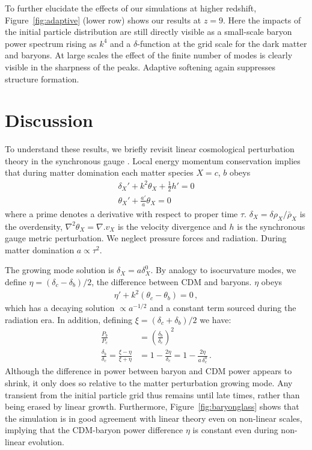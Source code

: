 \documentclass[a4paper,11pt]{article}
\begin{document}
To further elucidate the effects of our simulations at higher redshift, Figure~\ref{fig:adaptive} (lower row) shows our results at $z=9$. Here the impacts of the initial particle distribution are still directly visible as a small-scale baryon power spectrum rising as $k^4$ and a $\delta$-function at the grid scale for the dark matter and baryons. At large scales the effect of the finite number of modes is clearly visible in the sharpness of the peaks. Adaptive softening again suppresses structure formation.

\section{Discussion}
\label{sec:explanation}

To understand these results, we briefly revisit linear cosmological perturbation theory in the synchronous gauge \cite{Ma:1995}. Local energy momentum conservation implies that during matter domination each matter species $X = c$, $b$ obeys
\begin{align}
 \delta_X' + k^2 \theta_X + \frac{1}{2} h' = 0 \\
 \theta_X' + \frac{a'}{a} \theta_X = 0
\end{align}
where a prime denotes a derivative with respect to proper time $\tau$. $\delta_X = \delta \rho_X / \bar{\rho}_X$ is the overdensity, $\nabla^2 \theta_X = \nabla. v_X $ is the velocity divergence and $h$ is the synchronous gauge metric perturbation. We neglect pressure forces and radiation. During matter domination $a \propto \tau^2$.

The growing mode solution is $\delta_X = a \delta_X^0$. By analogy to isocurvature modes, we define $\eta = (\delta_c - \delta_b)/2$, the difference between CDM and baryons. $\eta$ obeys
\begin{align}
 \eta' + k^2 (\theta_c - \theta_b) = 0\,,
\end{align}
which has a decaying solution $\propto a^{-1/2}$ and a constant term sourced during the radiation era. In addition, defining $\xi = (\delta_c + \delta_b) / 2$ we have:
\begin{align}
 \frac{P_b} {P_c} &= \left(\frac{\delta_b} {\delta_c}\right)^2 \\
\frac{\delta_b} {\delta_c} = \frac{\xi - \eta} {\xi + \eta} & = 1 - \frac{ 2 \eta} {\delta_c} = 1 - \frac{ 2 \eta} {a \,\delta_c^0}\,.
\end{align}
Although the difference in power between baryon and CDM power appears to shrink, it only does so relative to the matter perturbation growing mode. Any transient from the initial particle grid thus remains until late times, rather than being erased by linear growth. Furthermore, Figure~\ref{fig:baryonglass} shows that the simulation is in good agreement with linear theory even on non-linear scales, implying that the CDM-baryon power difference $\eta$ is constant even during non-linear evolution.
\end{document}
